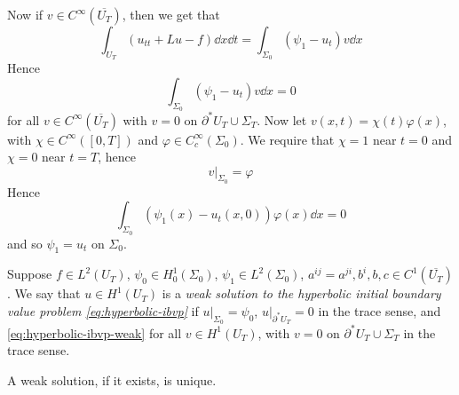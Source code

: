 \documentclass{article}
\begin{document}
Now if \(v \in C^\infty(\overline{U_T})\), then we get that
\[\int_{U_T}(u_{tt} + Lu - f)\dd x \dd t = \int_{\Sigma_0}(\psi_1 - u_t)v \dd x\]
Hence
\[\int_{\Sigma_0}(\psi_1 - u_t)v\dd x = 0\]
for all \(v \in C^\infty(\overline{U_T})\) with \(v = 0\) on \(\partial^*U_T \cup \Sigma_T\). Now let \(v(x, t) = \chi(t)\varphi(x)\), with \(\chi \in C^\infty([0, T])\) and \(\varphi \in C_c^\infty(\Sigma_0)\). We require that \(\chi = 1\) near \(t = 0\) and \(\chi = 0\) near \(t = T\), hence
\[v\vert_{\Sigma_0} = \varphi\]
Hence
\[\int_{\Sigma_0}(\psi_1(x) - u_t(x, 0))\varphi(x)\dd x = 0\]
and so \(\psi_1 = u_t\) on \(\Sigma_0\).

\begin{definition}
    Suppose \(f \in L^2(U_T)\), \(\psi_0 \in H_0^1(\Sigma_0)\), \(\psi_1 \in L^2(\Sigma_0)\), \(a^{ij}= a^{ji}, b^i, b, c \in C^1(\overline{U_T})\). We say that \(u \in H^1(U_T)\) is a \emph{weak solution to the hyperbolic initial boundary value problem \cref{eq:hyperbolic-ibvp}} if \(u\vert_{\Sigma_0} = \psi_0\), \(u \vert_{\partial^*U_T} = 0\) in the trace sense, and \cref{eq:hyperbolic-ibvp-weak} for all \(v \in H^1(U_T)\), with \(v = 0\) on \(\partial^*U_T \cup \Sigma_T\) in the trace sense.
\end{definition}

\begin{theorem}
    [uniqueness] A weak solution, if it exists, is unique.
\end{theorem}
\end{document}
